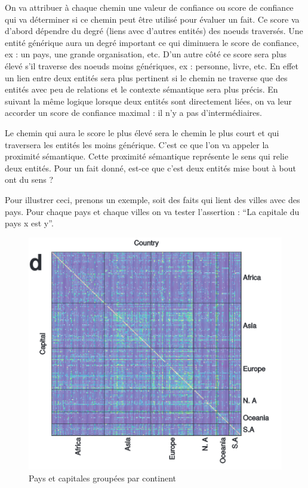 On va attribuer à chaque chemin une valeur de confiance ou score de confiance qui va déterminer si ce chemin peut être utilisé pour évaluer un fait. Ce score va d'abord dépendre du degré (liens avec d'autres entités) des noeuds traversés. Une entité générique aura un degré important ce qui diminuera le score de confiance, ex : un pays, une grande organisation, etc. D'un autre côté ce score sera plus élevé s'il traverse des noeuds moins génériques, ex : personne, livre, etc. En effet un lien entre deux entités sera plus pertinent si le chemin ne traverse que des entités avec peu de relations et le contexte sémantique sera plus précis. En suivant la même logique lorsque deux entités sont directement liées, on va leur accorder un score de confiance maximal : il n'y a pas d'intermédiaires.

Le chemin qui aura le score le plus élevé sera le chemin le plus court et qui traversera les entités les moins générique. C'est ce que l'on va appeler la proximité sémantique. Cette proximité sémantique représente le sens qui relie deux entités. Pour un fait donné, est-ce que c'est deux entités mise bout à bout ont du sens ? 

Pour illustrer ceci, prenons un exemple, soit des faits qui lient des villes avec des pays. Pour chaque pays et chaque villes on va tester l'assertion : \enquote{La capitale du pays x est y}.

\begin{figure}[h]
\centering
\includegraphics[draft=false, scale=0.5]{imgs/country_cap_check.PNG}
\caption{Pays et capitales groupées par continent}
\label{fig1}
\end{figure}

